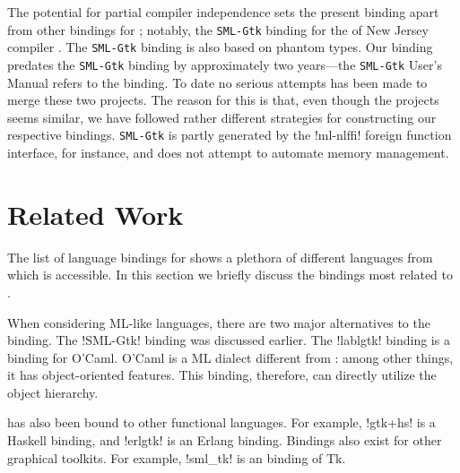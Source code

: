 \documentclass[finalversion]{usetex-v1}
\begin{document}
The potential for partial compiler independence sets the present binding
apart from other \gtk bindings for \sml; notably, the \texttt{SML-Gtk}
binding for the \sml of New Jersey compiler
\cite{SML-Gtk-webpage:2003}.  The \texttt{SML-Gtk} binding is also based
on phantom types. Our binding predates the \texttt{SML-Gtk} binding by
approximately two years---the \texttt{SML-Gtk} User's Manual refers to the
\mgtk binding.  To date no serious attempts has been made to merge
these two projects.  The reason for this is that, even though
the projects seems similar, we have followed rather different
strategies for constructing our respective bindings.  \texttt{SML-Gtk}
is partly generated by the !ml-nlffi! foreign function interface, for instance, and does not attempt to
automate memory management.




\section{Related Work}
\label{sec:related-work}

The list of language bindings for \gtk shows a plethora of different
languages from which \gtk is accessible. In this section we briefly
discuss the bindings most related to \mgtk.

When considering ML-like languages, there are two major alternatives
to the \mgtk binding. The !SML-Gtk! binding was discussed earlier.
%
The !lablgtk! binding is a \gtk binding for O'Caml.
O'Caml is a ML dialect different from \sml: among other
things, it
has object-oriented features. This binding, therefore, can
directly utilize the \gtk object hierarchy.

\gtk has also been bound to other functional languages.
For example, !gtk+hs! is a Haskell binding,
and !erlgtk! is an Erlang binding.
%
Bindings also exist for other graphical toolkits.
For example, !sml_tk! is an \sml binding of Tk.
\end{document}
